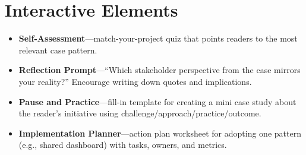 \section{Interactive Elements}
\label{sec:case-interactive}
\begin{itemize}
    \item \textbf{Self-Assessment}—match-your-project quiz that points readers to the most relevant case pattern.
    \item \textbf{Reflection Prompt}—``Which stakeholder perspective from the case mirrors your reality?'' Encourage writing down quotes and implications.
    \item \textbf{Pause and Practice}—fill-in template for creating a mini case study about the reader’s initiative using challenge/approach/practice/outcome.
    \item \textbf{Implementation Planner}—action plan worksheet for adopting one pattern (e.g., shared dashboard) with tasks, owners, and metrics.
\end{itemize}
